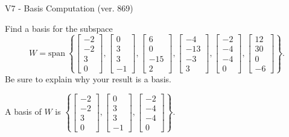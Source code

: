 \begin{exercise}
  \begin{exerciseTitle}V7 - Basis Computation (ver. 869)\end{exerciseTitle}
  \begin{exerciseStatement}
    Find a basis for the subspace 
\[W=\mathrm{span}\ \left\{\left[\begin{array}{r}
-2 \\
-2 \\
3 \\
0
\end{array}\right] , \left[\begin{array}{r}
0 \\
3 \\
3 \\
-1
\end{array}\right] , \left[\begin{array}{r}
6 \\
0 \\
-15 \\
2
\end{array}\right] , \left[\begin{array}{r}
-4 \\
-13 \\
-3 \\
3
\end{array}\right] , \left[\begin{array}{r}
-2 \\
-4 \\
-4 \\
0
\end{array}\right] , \left[\begin{array}{r}
12 \\
30 \\
0 \\
-6
\end{array}\right]\right\}.\]
 Be sure to explain why your result is a basis.


  \end{exerciseStatement}
  \begin{exerciseAnswer}
   A basis of \(W\) is  \(\left\{\left[\begin{array}{r}
-2 \\
-2 \\
3 \\
0
\end{array}\right] , \left[\begin{array}{r}
0 \\
3 \\
3 \\
-1
\end{array}\right] , \left[\begin{array}{r}
-2 \\
-4 \\
-4 \\
0
\end{array}\right]\right\}\).
  


  \end{exerciseAnswer}
\end{exercise}
